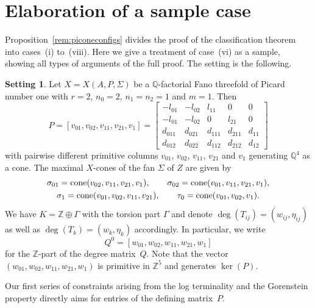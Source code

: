 \documentclass[pdftex]{sigma}%
\theoremstyle{definition}
\newtheorem{setting}[thm]{Setting}
\def\ZZ{{\mathbb Z}}
\def\QQ{{\mathbb Q}}
\def\cone{{\rm cone}}
\numberwithin{equation}{section}
\begin{document}
\section{Elaboration of a sample case}
\label{sec:sample}

Proposition~\ref{rem:piconeconfigs} divides
the proof of the classification theorem
into cases~(i) to~(viii).
Here we give a treatment of case~(vi)
as a sample, showing all types of
arguments of the full proof.
The setting is the following.


\begin{setting}
\label{setting:r=2-n0=2-n1=1-n2=1-m=1}
Let $X = X(A,P,\Sigma)$ be a $\QQ$-factorial
Fano threefold of Picard number one with
$r=2$, $n_0=2$, $n_1=n_2=1$ and $m=1$.
Then
\begin{equation*}
P =[v_{01},v_{02},v_{11},v_{21},v_1] =
\begin{bmatrix}
-l_{01} & -l_{02} & l_{11} & 0 & 0
\\
-l_{01} & -l_{02} & 0 & l_{21} & 0
\\
d_{011} & d_{021} & d_{111} & d_{211} & d_{11}
\\
d_{012} & d_{022} & d_{112} & d_{212} & d_{12}
\end{bmatrix}
\end{equation*}
with pairwise different primitive columns
$v_{01}$, $v_{02}$, $v_{11}$, $v_{21}$ and $v_1$
generating $\QQ^4$ as a cone.
The maximal $X$-cones of the fan $\Sigma$ of $Z$ are given by
\begin{gather*}
\sigma_{01} = \cone(v_{02},v_{11},v_{21},v_1),\qquad
\sigma_{02} = \cone(v_{01},v_{11},v_{21},v_1),
\\
\sigma_{1} = \cone(v_{01},v_{02},v_{11},v_{21}),\qquad
\tau_{0} = \cone(v_{01},v_{02},v_1).
\end{gather*}
We have $K = \ZZ \oplus \Gamma$ with the torsion part
$\Gamma$ and denote $\deg(T_{ij}) = (w_{ij},\eta_{ij})$ as well
as $\deg(T_{k}) = (w_{k},\eta_{k})$ accordingly.
In particular, we write
\begin{equation*}
Q^0
 =
[w_{01},w_{02},w_{11},w_{21},w_1]
\end{equation*}
for the $\ZZ$-part of the degree matrix~$Q$. Note that the
vector~$(w_{01},w_{02},w_{11},w_{21},w_1)$ is primitive
in $\ZZ^5$ and generates $\ker(P)$.
\end{setting}


Our first series of constraints arising
from the log terminality and the Gorenstein
property directly aims for entries of
the defining matrix~$P$.
\end{document}
